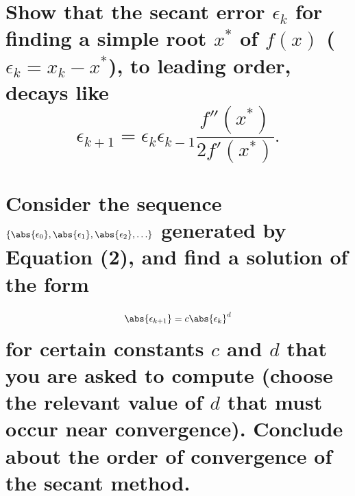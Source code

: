 \documentclass[boxes,pages]{homework}
\begin{document}
\begin{problem}
\begin{parts}
	\part{Show that the secant error $\epsilon_k$ for finding a simple root $x^*$ of $f(x)$ ($\epsilon_k = x_k - x^*$), to leading order, decays like \[\epsilon_{k+1} = \epsilon_k\epsilon_{k-1}\frac{f''(x^*)}{2f'(x^*)}.\]}\label{part:11a}
	\part{Consider the sequence $\{\abs{\epsilon_0}, \abs{\epsilon_1}, \abs{\epsilon_2},\ldots\}$ generated by Equation (2), and find a solution of the form \[\abs{\epsilon_{k+1}} = c\abs{\epsilon_k}^d\] for certain constants $c$ and $d$ that you are asked to compute (choose the relevant value of $d$ that must occur near convergence). Conclude about the order of convergence of the secant method.}\label{part:11b}
\end{parts}
\end{problem}
\end{document}
